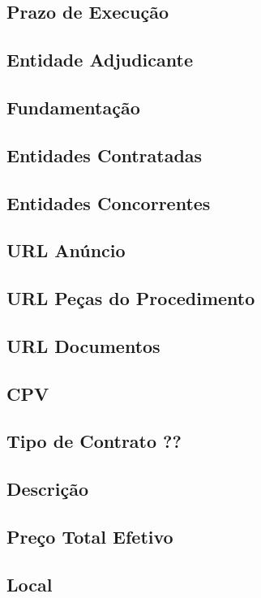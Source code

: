 \subsection{Prazo de Execução}

\subsection{Entidade Adjudicante}

\subsection{Fundamentação}

\subsection{Entidades Contratadas}

\subsection{Entidades Concorrentes}

\subsection{URL Anúncio}

\subsection{URL Peças do Procedimento}

\subsection{URL Documentos}

\subsection{CPV}

\subsection{Tipo de Contrato ??}

\subsection{Descrição}

\subsection{Preço Total Efetivo}

\subsection{Local}

	


